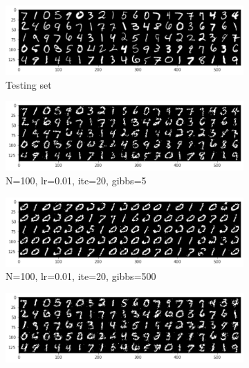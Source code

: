 \documentclass{article}
\begin{document}
\begin{figure}[h!]
     \centering
     \begin{subfigure}[b]{0.3\textwidth}
         \centering
         \includegraphics[width=\textwidth]{lab4/test.pdf}
         \caption{Testing set}
         \label{fig:noise5ite10}
     \end{subfigure}
     \hfill
     \begin{subfigure}[b]{0.3\textwidth}
         \centering
         \includegraphics[width=\textwidth]{lab4/100_0.01_20_5.pdf}
         \caption{N=100, lr=0.01, ite=20, gibbs=5}
         \label{fig:noise5ite100}
     \end{subfigure}
     \hfill
     \begin{subfigure}[b]{0.3\textwidth}
         \centering
         \includegraphics[width=\textwidth]{lab4/100_0.01_20_500.pdf}
         \caption{N=100, lr=0.01, ite=20, gibbs=500}
         \label{fig:noise5ite500}
     \end{subfigure}
     \begin{subfigure}[b]{0.3\textwidth}
         \centering
         \includegraphics[width=\textwidth]{lab4/200_0.001_20_5.pdf}

\end{subfigure}
\end{figure}
\end{document}
